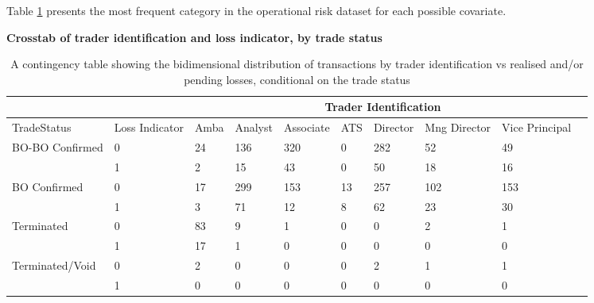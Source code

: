 \documentclass[]{article}
\begin{document}
Table \ref{tab:Crosstab_covariate} presents the most frequent category
in the operational risk dataset for each possible covariate.

\begin{table}[htbp]
        \centering
        \textbf{Crosstab of trader identification and loss indicator, by trade status}
\singlespacing        
        \small
        \setlength\tabcolsep{2pt}
            \begin{tabular}{|p{2cm}|p{2cm}|l|l|l|l|l|l|p{2cm}|p{2cm}|} \hline
            & & \multicolumn{7}{|c|}{Trader Identification} \\ \hline
            TradeStatus & Loss Indicator & Amba & Analyst & Associate & ATS & Director & Mng Director & Vice Principal \\\hline
            \multirow{2}{*}{BO-BO Confirmed} & 0 & 24 & 136 & 320 & 0 & 282 & 52 & 49 \\ \cline{2-9}
                                   & 1 & 2  &  15 & 43 & 0 & 50 & 18 & 16 \\\cline{2-9}
            \multirow{2}{*}{BO Confirmed} & 0 & 17  & 299 & 153 & 13 & 257 & 102 & 153 \\ \cline{2-9}
                                   & 1 &  3 &  71 & 12 & 8 &  62 & 23 & 30 \\ \cline{2-9}
            \multirow{2}{*}{Terminated}       & 0 & 83 & 9 & 1 & 0 & 0 & 2 & 1 \\ \cline{2-9}
                                  & 1 & 17 & 1 & 0 & 0 & 0 & 0 & 0 \\ \cline{2-9}
            \multirow{2}{*}{Terminated/Void}  & 0 & 2 & 0 & 0 & 0 & 2 & 1 & 1 \\ \cline{2-9}
                                   & 1 & 0 & 0 & 0 & 0 & 0 & 0 & 0 \\ \hline
            \end{tabular}
            \caption{A contingency table showing the bidimensional distribution of transactions by trader identification vs realised and/or pending losses, conditional on the trade status}
            \label{tab:Crosstab_covariate}
\end{table}
\doublespacing
\end{document}
